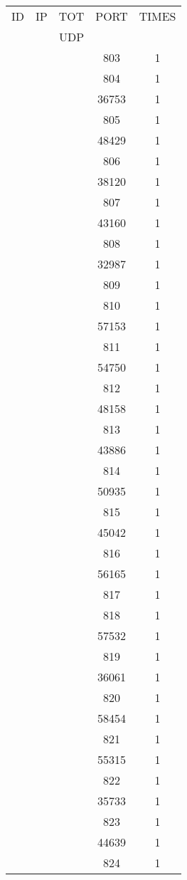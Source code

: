 \documentclass[a4paper]{scrartcl}
\begin{document}
\begin{minipage}[b]{0.5\linewidth}
\begin{tabular}{| c | c | c | c | c |}
\hline
ID & IP & TOT & PORT & TIMES \\ 
   &    & UDP &      &       \\ 
\hline
& & & 803 & 1 \\ & & & 804 & 1 \\ & & & 36753 & 1 \\ & & & 805 & 1 \\ & & & 48429 & 1 \\ & & & 806 & 1 \\ & & & 38120 & 1 \\ & & & 807 & 1 \\ & & & 43160 & 1 \\ & & & 808 & 1 \\ & & & 32987 & 1 \\ & & & 809 & 1 \\ & & & 810 & 1 \\ & & & 57153 & 1 \\ & & & 811 & 1 \\ & & & 54750 & 1 \\ & & & 812 & 1 \\ & & & 48158 & 1 \\ & & & 813 & 1 \\ & & & 43886 & 1 \\ & & & 814 & 1 \\ & & & 50935 & 1 \\ & & & 815 & 1 \\ & & & 45042 & 1 \\ & & & 816 & 1 \\ & & & 56165 & 1 \\ & & & 817 & 1 \\ & & & 818 & 1 \\ & & & 57532 & 1 \\ & & & 819 & 1 \\ & & & 36061 & 1 \\ & & & 820 & 1 \\ & & & 58454 & 1 \\ & & & 821 & 1 \\ & & & 55315 & 1 \\ & & & 822 & 1 \\ & & & 35733 & 1 \\ & & & 823 & 1 \\ & & & 44639 & 1 \\ & & & 824 & 1 \\ \hline\end{tabular}\end{minipage} \hfill\begin{minipage}[b]{0.5\linewidth}\begin{tabular}{| c | c | c | c | c |}

\end{tabular}
\end{minipage}
\end{document}
